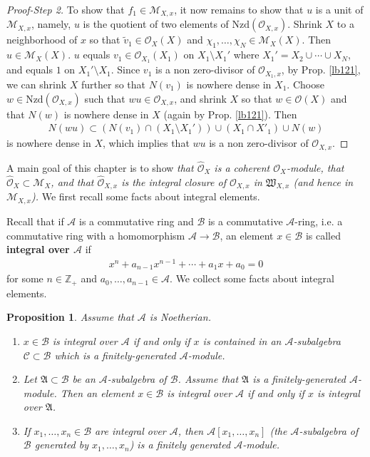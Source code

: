 \documentclass[12pt,b5paper,notitlepage]{report}
\theoremstyle{definition}
\theoremstyle{plain}
\newtheorem{pp}[df]{Proposition}
\newcommand{\fk}{\mathfrak}
\newcommand{\mc}{\mathcal}
\newcommand{\wtd}{\widetilde}
\newcommand{\scr}{\mathscr}
\newcommand{\Zbb}{\mathbb Z}
\newcommand{\Nzd}{\mathrm{Nzd}}
\newcommand{\Owht}{\widehat{\scr O}}
\numberwithin{equation}{section}
\begin{document}
\begin{proof}[Proof-Step 2]
To show that $f_1\in\scr M_{X,x}$, it now remains to show that $u$ is a unit of $\scr M_{X,x}$, namely, $u$ is the quotient of two elements of $\Nzd(\scr O_{X,x})$. Shrink $X$ to a neighborhood of $x$ so that $\wtd v_1\in\scr O_X(X)$ and $\chi_1,\dots,\chi_N\in\scr M_X(X)$. Then $u\in\scr M_X(X)$. $u$ equals $v_1\in\scr O_{X_1}(X_1)$ on $X_1\setminus X_1'$ where $X_1'=X_2\cup\cdots\cup X_N$, and equals $1$ on $X_1'\setminus X_1$. Since $v_1$ is a non zero-divisor of $\scr O_{X_1,x}$, by Prop. \ref{lb121}, we can shrink $X$ further so that $N(v_1)$ is nowhere dense in $X_1$. Choose $w\in\Nzd(\scr O_{X,x})$ such that $wu\in\scr O_{X,x}$, and shrink $X$ so that $w\in\scr O(X)$ and that $N(w)$ is nowhere dense in $X$ (again by Prop. \ref{lb121}). Then
\begin{align*}
N(wu)\subset (N(v_1)\cap(X_1\setminus X_1'))\cup (X_1\cap X'_1)\cup N(w)
\end{align*}
is nowhere dense in $X$, which implies that $wu$ is a non zero-divisor of $\scr O_{X,x}$.
\end{proof}










A main goal of this chapter is to show \textit{\color{red}that $\Owht_X$ is a coherent $\scr O_X$-module, that $\Owht_X\subset\scr M_X$, and that $\Owht_{X,x}$ is the integral closure of $\scr O_{X,x}$ in $\fk W_{X,x}$ (and hence in $\scr M_{X,x}$).} We first recall some facts about integral elements.


Recall that if $\mc A$ is a commutative ring and $\mc B$ is a commutative $\mc A$-ring, i.e. a commutative ring with a homomorphism $\mc A\rightarrow\mc B$, an element $x\in\mc B$ is called \textbf{integral over $\mc A$}  if
\begin{align}
x^n+a_{n-1}x^{n-1}+\cdots+a_1x+a_0=0
\end{align}
for some $n\in\Zbb_+$ and $a_0,\dots,a_{n-1}\in\mc A$. We collect some facts about integral elements.


\begin{pp}\label{lb188}
Assume that $\mc A$ is Noetherian.
\begin{enumerate}
\item $x\in\mc B$ is integral over $\mc A$ if and only if $x$ is contained in an $\mc A$-subalgebra $\mc C\subset\mc B$  which is a finitely-generated $\mc A$-module.

\item Let $\fk A\subset \mc B$ be an $\mc A$-subalgebra of $\mc B$. Assume that $\fk A$ is a finitely-generated $\mc A$-module. Then an element $x\in \mc B$ is integral over $\mc A$ if and only if $x$ is integral over $\fk A$.

\item If $x_1,\dots,x_n\in\mc B$ are integral over $\mc A$, then $\mc A[x_1,\dots,x_n]$ (the $\mc A$-subalgebra of $\mc B$ generated by $x_1,\dots,x_n$) is a finitely generated $\mc A$-module.
\end{enumerate}
\end{pp}
\end{document}
